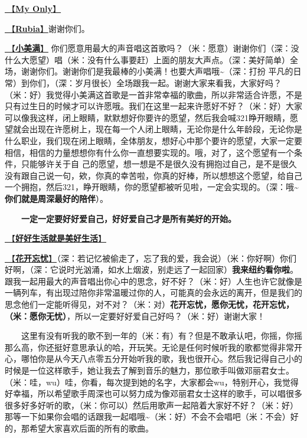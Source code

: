 \documentclass[]{ctexbook}
\begin{document}
\hyperref[my-only]{🎵【\textbf{My Only}】}

\hyperref[rubia]{🎵【\textbf{Rubia}】}谢谢你们。

\hyperref[happy-ending]{🎵【\textbf{小美满}】} 你们愿意用最大的声音唱这首歌吗？（米：愿意）谢谢你们（深：没什么大愿望）唱（米：没有什么事要赶）上面的朋友大声点。（深：美好简单）全场，谢谢你们。谢谢你们是我最棒的小美满！也要大声唱哦\textasciitilde（深：打扮 平凡的日常）到你们，（深：岁月很长）全场跟我一起。谢谢大家来看我，大家好吗？（米：好）我觉得小美满这首歌是一首非常幸福的歌曲，所以非常适合许愿，不是只有过生日的时候才可以许愿哦。我们在这里一起来许愿好不好？（米：好）大家可以像我这样，闭上眼睛，默默想好你要许的愿望，然后我会喊321睁开眼睛，愿望就会出现在许愿树上，现在每一个人闭上眼睛，无论你是什么年龄段，无论你是什么职业，我们现在闭上眼睛，全体朋友，想好心中那个要许的愿望，大家一定要相信，相信的力量想想你有什么你一直想要实现的。哦，对了，这个愿望有一个条件，只能够许关于自 己的愿望，想一想是不是很久没有拥抱过自己，是不是很久没有跟自己说一句，欸，你真的幸苦啦，你真的好棒，所以想想这个愿望，给自己一个拥抱，然后321，睁开眼睛，你的愿望都被听见啦，一定会实现的。（深：哦\textasciitilde{}\textbf{你们就是周深最好的陪伴}）。

  \textbf{一定一定要好好爱自己，好好爱自己才是所有美好的开始。}

\hyperref[live-happy-life-happy]{🎵【\textbf{好好生活就是美好生活}】}

\hyperref[no-worries]{🎵【\textbf{花开忘忧}】}（深：若记忆被偷走了，忘了我的爱，我会说）（米：你好啊）你们好啊，（深：它说时光汹涌，如水上烟波，别走远了一起回家）\textbf{我来纽约看你啦}。跟我一起用最大的声音唱出你心中的思念，好不好？（米：好）人生也许它就像是一辆列车，有出现过陪你非常温暖过你的人，可能真的会永远的离开，但是我们的思念他们一定能听得见，对不对？（米：对）\textbf{花开忘忧，愿你无忧，花开忘忧，（米：愿你无忧）}，所以一定要好好爱自己好吗？（米：好）谢谢大家！

  这里有没有听我的歌不到一年的（米：有）有？但是不敢承认吧，你摇，你摇那么高，你还挺好意思承认的哈，开玩笑。无论是任何时候听我的歌都觉得非常开心，哪怕你是从今天八点零五分开始听我的歌，我也很开心。然后我记得自己小的时候是一位这样歌手，她让我去了解到音乐的魅力，那位歌手叫做邓丽君女士。（米：哇，wu）哇，你看，每次提到她的名字，大家都会wu，特别开心，我觉得好幸福，所以希望歌手周深也可以努力成为像邓丽君女士这样的歌手，可以唱很多很多好多好听的歌，（米：你可以）然后用歌声一起陪着大家好不好？（米：好）那等一下如果你会唱的话跟我一起唱哦\textasciitilde（米：好）不会不会唱吧（米：不会）好的，那希望大家喜欢后面的所有的歌曲。
\end{document}
